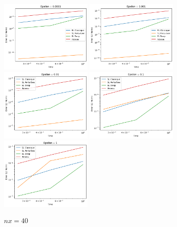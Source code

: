 \documentclass{article}
\begin{document}
\begin{figure}[!h]
    \centering
    \includegraphics[width=0.4\textwidth]{images/ep21.png}
    \includegraphics[width=0.4\textwidth]{images/ep22.png}
    \includegraphics[width=0.4\textwidth]{images/ep23.png}
    \includegraphics[width=0.4\textwidth]{images/ep24.png}
    \includegraphics[width=0.4\textwidth]{images/ep25.png}
    \caption{$nx = 40$}
\end{figure}
\end{document}
